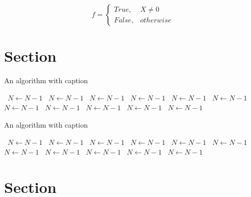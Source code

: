\documentclass[a4paper]{article}
\begin{document}
\begin{equation}   f =
\begin{cases} True, & X \neq 0\\
False, & otherwise
\end{cases}
\end{equation}

\section{Section}

\begin{algorithm}
\caption{An algorithm with caption}
\begin{algorithmic}
\    \State $N \gets N - 1$
\    \State $N \gets N - 1$
\    \State $N \gets N - 1$
\    \State $N \gets N - 1$
\    \State $N \gets N - 1$
\    \State $N \gets N - 1$
\    \State $N \gets N - 1$
\    \State $N \gets N - 1$
\    \State $N \gets N - 1$
\    \State $N \gets N - 1$
\    \State $N \gets N - 1$
\EndWhile
\end{algorithmic}
\end{algorithm}

\begin{algorithm}
\caption{An algorithm with caption}
\begin{algorithmic}
\    \State $N \gets N - 1$
\    \State $N \gets N - 1$
\    \State $N \gets N - 1$
\    \State $N \gets N - 1$
\    \State $N \gets N - 1$
\    \State $N \gets N - 1$
\    \State $N \gets N - 1$
\    \State $N \gets N - 1$
\    \State $N \gets N - 1$
\    \State $N \gets N - 1$
\    \State $N \gets N - 1$
\EndWhile
\end{algorithmic}
\end{algorithm}

\section{Section}
\end{document}

